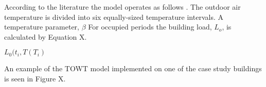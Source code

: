 According to the literature the model operates as follows \cite{price_methods_2010}. The outdoor air temperature is divided into six equally-sized temperature intervals. A temperature parameter, $\beta$ For occupied periods the building load, $L_o$, is calculated by Equation X.

$L_0(t_i,T(T_i)$

An example of the TOWT model implemented on one of the case study buildings is seen in Figure X. 